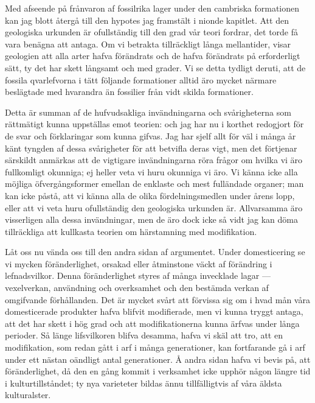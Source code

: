 Med afseende på frånvaron af fossilrika lager under den cambriska formationen kan jag blott återgå till den hypotes jag framstält i nionde kapitlet. Att den geologiska urkunden är ofullständig till den grad vår teori fordrar, det torde få vara benägna att antaga. Om vi betrakta tillräckligt långa mellantider, visar geologien att alla arter hafva förändrats och de hafva förändrats på erforderligt sätt, ty det har skett långsamt och med grader. Vi se detta tydligt deruti, att de fossila qvarlefvorna i tätt följande formationer alltid äro mycket närmare beslägtade med hvarandra än fossilier från vidt skilda formationer.

Detta är summan af de hufvudsakliga invändningarna och svårigheterna som rättmätigt kunna uppställas emot teorien: och jag har nu i korthet redogjort för de svar och förklaringar som kunna gifvas. Jag har sjelf allt för väl i många år känt tyngden af dessa svårigheter för att betvifla deras vigt, men det förtjenar särskildt anmärkas att de vigtigare invändningarna röra frågor om hvilka vi äro fullkomligt okunniga; ej heller veta vi huru okunniga vi äro. Vi känna icke alla möjliga öfvergångsformer emellan de enklaste och mest fulländade organer; man kan icke påstå, att vi känna alla de olika fördelningsmedlen under årens lopp, eller att vi veta huru ofullständig den geologiska urkunden är. Allvarsamma äro visserligen alla dessa invändningar, men de äro dock icke så vidt jag kan döma tillräckliga att kullkasta teorien om härstamning med modifikation.

Låt oss nu vända oss till den andra sidan af argumentet. Under domesticering se vi mycken föränderlighet, orsakad eller åtminstone väckt af förändring i lefnadsvilkor. Denna föränderlighet styres af många invecklade lagar — vexelverkan, användning och overksamhet och den bestämda verkan af omgifvande förhållanden. Det är mycket svårt att förvissa sig om i hvad mån våra domesticerade produkter hafva blifvit modifierade, men vi kunna tryggt antaga, att det har skett i hög grad och att modifikationerna kunna ärfvas under långa perioder. Så länge lifsvilkoren blifva desamma, hafva vi skäl att tro, att en modifikation, som redan gått i arf i många generationer, kan fortfarande gå i arf under ett nästan oändligt antal generationer. Å andra sidan hafva vi bevis på, att föränderlighet, då den en gång kommit i verksamhet icke upphör någon längre tid i kulturtillståndet; ty nya varieteter bildas ännu tillfälligtvis af våra äldsta kulturalster.

